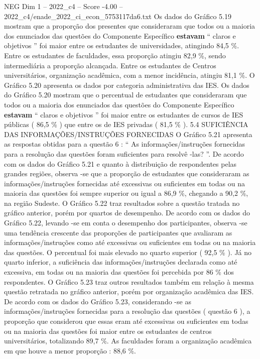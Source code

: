 \begin{textsample}{NEG Dim 1 – 2022\_c4 – Score -4.00 – 2022\_c4/enade\_2022\_ci\_econ\_5753117da6.txt}
Os dados do Gráfico 5.19 mostram que a proporção dos presentes que consideraram que todos ou a maioria dos enunciados das questões do Componente Específico \textbf{estavam} “ claros e objetivos ” foi maior entre os estudantes de universidades, atingindo 84,5 \%.
Entre os estudantes de faculdades, essa proporção atingiu 82,9 \%, sendo intermediária a proporção alcançada.
Entre os estudantes de Centros universitários, organização acadêmica, com a menor incidência, atingiu 81,1 \%.
O Gráfico 5.20 apresenta os dados por categoria administrativa das IES.
Os dados do Gráfico 5.20 mostram que o percentual de estudantes que consideraram que todos ou a maioria dos enunciados das questões do Componente Específico \textbf{estavam} “ claros e objetivos ” foi maior entre os estudantes de cursos de IES públicas ( 86,5 \% ) que entre os de IES privadas ( 81,5 \% ). 5.4 SUFICIÊNCIA DAS INFORMAÇÕES/INSTRUÇÕES FORNECIDAS O Gráfico 5.21 apresenta as respostas obtidas para a questão 6 : “ As informações/instruções fornecidas para a resolução das questões foram suficientes para resolvê -las? ”.
De acordo com os dados do Gráfico 5.21 e quanto à distribuição de respondentes pelas grandes regiões, observa -se que a proporção de estudantes que consideraram as informações/instruções fornecidas até excessivas ou suficientes em todas ou na maioria das questões foi sempre superior ou igual a 86,9 \%, chegando a 90,2 \%, na região Sudeste.
O Gráfico 5.22 traz resultados sobre a questão tratada no gráfico anterior, porém por quartos de desempenho.
De acordo com os dados do Gráfico 5.22, levando -se em conta o desempenho dos participantes, observa -se uma tendência crescente das proporções de participantes que avaliaram as informações/instruções como até excessivas ou suficientes em todas ou na maioria das questões.
O percentual foi mais elevado no quarto superior ( 92,5 \% ).
Já no quarto inferior, a suficiência das informações/instruções declarada como até excessiva, em todas ou na maioria das questões foi percebida por 86 \% dos respondentes.
O Gráfico 5.23 traz outros resultados também em relação à mesma questão retratada no gráfico anterior, porém por organização acadêmica das IES.
De acordo com os dados do Gráfico 5.23, considerando -se as informações/instruções fornecidas para a resolução das questões ( questão 6 ), a proporção que considerou que essas eram até excessivas ou suficientes em todas ou na maioria das questões foi maior entre os estudantes de centros universitários, totalizando 89,7 \%.
As faculdades foram a organização acadêmica em que houve a menor proporção : 88,6 \%.

\end{textsample}
